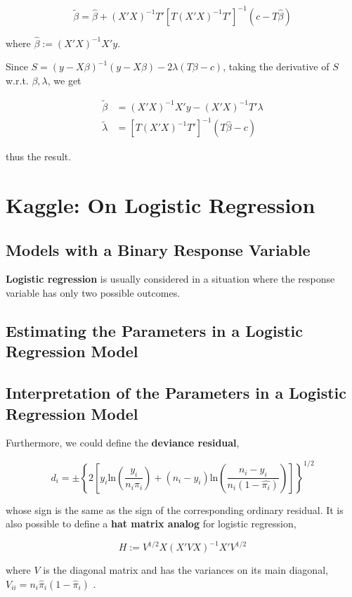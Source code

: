 \documentclass[12pt]{article}
\begin{document}
$$
\tilde{\beta} = \hat{\beta} + (X'X)^{-1} T' [T(X'X)^{-1}T']^{-1} (c - T\hat{\beta})
$$

where $\hat{\beta} := (X' X)^{-1} X' y$.

Since $S = (y- X\beta)^{-1} (y- X\beta) - 2 \lambda (T\beta - c)$, taking the derivative of $S$ w.r.t. $\beta, \lambda$, we get

$$
\begin{aligned}
\tilde{\beta} &= (X'X)^{-1}X'y - (X'X)^{-1}T'\lambda \\
\tilde{\lambda} &= [T(X'X)^{-1}T']^{-1} (T \hat{\beta} - c)
\end{aligned}
$$

thus the result.


\pagebreak

\section*{Kaggle: On Logistic Regression}

\setcounter{section}{1}
\setcounter{subsection}{0}

\subsection{Models with a Binary Response Variable}

\textbf{Logistic regression} is usually considered in a situation where the response variable has only two possible outcomes. 


\subsection{Estimating the Parameters in a Logistic Regression Model}


\subsection{Interpretation of the Parameters in a Logistic Regression Model}



Furthermore, we could define the \textbf{deviance residual},

$$
d_i = \pm \left\{ 2 \left[   y_i \mathrm{ln} \left( \frac{y_i}{n_i \hat{\pi_i}} \right) +
(n_i - y_i) \mathrm{ln} \left( \frac{n_i - y_i}{n_i (1 - \hat{\pi_i})} \right)  \right] \right\}^{1/2}
$$

whose sign is the same as the sign of the corresponding ordinary residual. It is also possible to define a \textbf{hat matrix analog} for logistic regression,

$$
H := V^{1/2} X (X' V X)^{-1} X' V^{1/2}
$$

where $V$ is the diagonal matrix and has the variances on its main diagonal, $V_{ii} = n_i \hat{\pi}_i (1 - \hat{\pi}_i)$ .
\end{document}
